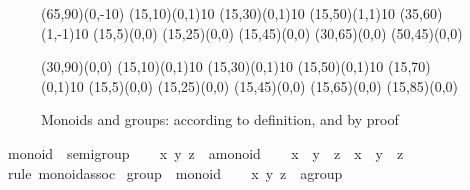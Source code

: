 \begin{isabellebody}
\begin{isamarkuptext}
 \begin{figure}[htbp]
   \begin{center}
     \small
     \unitlength 0.6mm
     \begin{picture}(65,90)(0,-10)
       \put(15,10){\line(0,1){10}} \put(15,30){\line(0,1){10}}
       \put(15,50){\line(1,1){10}} \put(35,60){\line(1,-1){10}}
       \put(15,5){\makebox(0,0){}}
       \put(15,25){\makebox(0,0){}}
       \put(15,45){\makebox(0,0){}}
       \put(30,65){\makebox(0,0){}} \put(50,45){\makebox(0,0){}}
     \end{picture}
     \hspace{4em}
     \begin{picture}(30,90)(0,0)
       \put(15,10){\line(0,1){10}} \put(15,30){\line(0,1){10}}
       \put(15,50){\line(0,1){10}} \put(15,70){\line(0,1){10}}
       \put(15,5){\makebox(0,0){}}
       \put(15,25){\makebox(0,0){}}
       \put(15,45){\makebox(0,0){}}
       \put(15,65){\makebox(0,0){}}
       \put(15,85){\makebox(0,0){}}
     \end{picture}
     \caption{Monoids and groups: according to definition, and by proof}
     \label{fig:monoid-group}
   \end{center}
 \end{figure}%
\end{isamarkuptext}%
\isamarkuptrue%
\isamarkupfalse%
\ monoid\ {\isasymsubseteq}\ semigroup\isanewline
%
\isadelimproof
%
\endisadelimproof
%
\isatagproof
{}\isamarkupfalse%
\isanewline
\ \ \isamarkupfalse%
\ x\ y\ z\ {\isacharcolon}{\isacharcolon}\ {\isachardoublequoteopen}{\isacharprime}a{\isasymColon}monoid{\isachardoublequoteclose}\isanewline
\ \ \isamarkupfalse%
\ {\isachardoublequoteopen}x\ {\isasymodot}\ y\ {\isasymodot}\ z\ {\isacharequal}\ x\ {\isasymodot}\ {\isacharparenleft}y\ {\isasymodot}\ z{\isacharparenright}{\isachardoublequoteclose}\isanewline
\ \ \ \ \isamarkupfalse%
\ {\isacharparenleft}rule\ monoid{\isachardot}assoc{\isacharparenright}\isanewline
{}\isamarkupfalse%
%
\endisatagproof
{\isafoldproof}%
%
\isadelimproof
\isanewline
%
\endisadelimproof
\isanewline
{}\isamarkupfalse%
\ group\ {\isasymsubseteq}\ monoid\isanewline
%
\isadelimproof
%
\endisadelimproof
%
\isatagproof
{}\isamarkupfalse%
\isanewline
\ \ \isamarkupfalse%
\ x\ y\ z\ {\isacharcolon}{\isacharcolon}\ {\isachardoublequoteopen}{\isacharprime}a{\isasymColon}group{\isachardoublequoteclose}\isanewline

\end{isabellebody}
